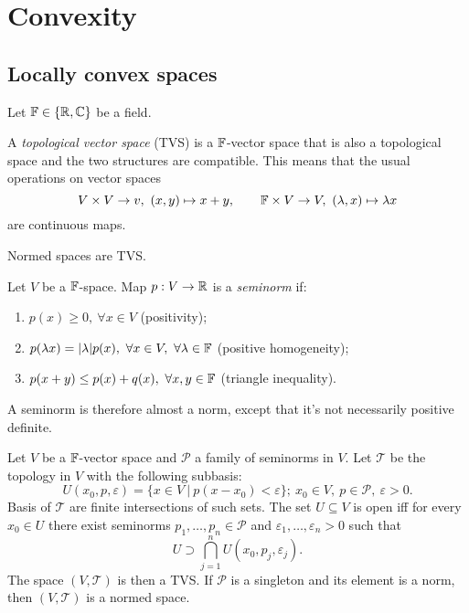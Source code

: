 \section{Convexity}

\subsection{Locally convex spaces}

Let $\mathbb {F} \in \{\mathbb {R}, \mathbb {C}\}$ be a field.

\begin{definition}
    A \emph{topological vector space} (TVS) is a $\mathbb {F}$-vector space that is also a topological space
    and the two structures are compatible. This means that the usual operations on vector spaces
    $$V \times V \to v,\ (x, y)\mapsto x + y,\qquad \mathbb {F} \times V \to V,\ (\lambda, x)\mapsto \lambda x$$
    are continuous maps.
\end{definition}

\begin{example}
    Normed spaces are TVS.
\end{example}

\begin{definition}
    Let $V$ be a $\mathbb {F}$-space. Map $p: V \to \mathbb {R}$ is a \emph{seminorm} if:
    \begin{enumerate}
        \item $p(x) \geq 0,\ \forall x \in V$ (positivity);
        \item $p(\lambda x) = |\lambda| p(x),\ \forall x \in V,\ \forall \lambda \in \F$ (positive homogeneity);
        \item $p(x + y)\leq p(x) + q(x),\ \forall x, y \in \mathbb {F}$ (triangle inequality).
    \end{enumerate}
    A seminorm is therefore almost a norm, except that it's not necessarily positive definite.
\end{definition}

Let $V$ be a $\mathbb {F}$-vector space and $\mathcal{P}$ a family of seminorms in $V$.
Let $\mathcal{T}$ be the topology in $V$ with the following subbasis:
$$U(x_0, p, \varepsilon) = \{x \in V\ |\ p(x - x_0) < \varepsilon\};\ x_0 \in V,\ p \in \mathcal{P},\ \varepsilon > 0.$$
Basis of $\mathcal{T}$ are finite intersections of such sets.
The set $U \subseteq V$ is open iff for every $x_0 \in U$ there exist seminorms $p_1, \dots, p_n \in \mathcal{P}$
and $\varepsilon_1, \dots, \varepsilon_n > 0$ such that 
$$U \supset \bigcap_{j = 1} ^n U(x_0, p_j, \varepsilon_j).$$
The space $(V, \mathcal{T})$ is then a TVS. If $\mathcal{P}$ is a singleton 
and its element is a norm, then $(V, \mathcal{T})$ is a normed space.

